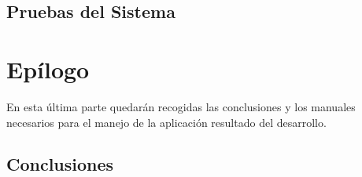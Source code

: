 \documentclass[a4paper,11pt]{book}
\begin{document}
\chapter{Pruebas del Sistema}


\part{Epí­logo}
\null\vfill
\noindent En esta última parte quedarán recogidas las conclusiones y los manuales necesarios para el manejo de la aplicación resultado del desarrollo. 
\vfill

%

%

\chapter{Conclusiones}



\chapter*{\bibname}
\renewcommand{\bibname}{}



\begingroup
  \def\chapter*#1{}
\renewcommand{\bibname}{}



\backmatter

%
\end{document}
